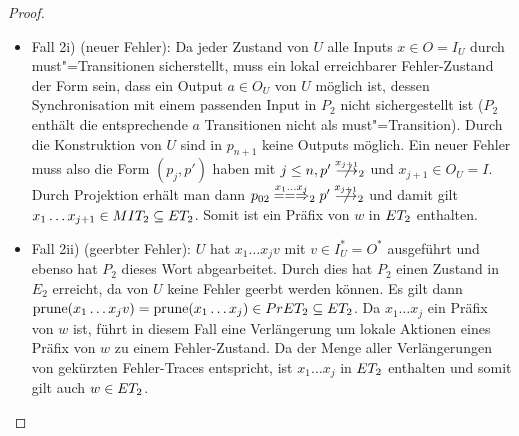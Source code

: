 \begin{proof}
\begin{itemize}
\begin{itemize}
        \item Fall 2i) (neuer Fehler): Da jeder Zustand von $U$ alle Inputs
          $x\in O=I_U$ durch must"=Transitionen sicherstellt, muss ein lokal
          erreichbarer Fehler-Zustand der Form sein, dass ein Output $a\in O_U$
          von $U$ möglich ist, dessen Synchronisation mit einem passenden Input
          in $P_2$ nicht sichergestellt ist ($P_2$ enthält die entsprechende
          $a$ Transitionen nicht als must"=Transition). Durch die Konstruktion
          von $U$ sind in $p_{n+1}$ keine Outputs möglich. Ein neuer Fehler
          muss also die Form $(p_j,p')$ haben mit $j\leq n,
          p'\nmust[x_{j+1}]_2$ und $x_{j+1}\in O_U=I$. Durch Projektion erhält
          man dann $p_{02}\lweakmay[x_1\dots x_j]_2p'\nmust[x_{j+1}]_2$ und
          damit gilt $x_1\dots x_{j+1}\in MIT _2\subseteq ET _2$. Somit ist
          ein Präfix von $w$ in $ET _2$ enthalten.
        \item Fall 2ii) (geerbter Fehler): $U$ hat $x_1\dots x_jv$ mit $v\in
          I_U^*=O^*$ ausgeführt und ebenso hat $P_2$ dieses Wort abgearbeitet.
          Durch dies hat $P_2$ einen Zustand  in $E_2$ erreicht, da von $U$
          keine Fehler geerbt werden können. Es gilt dann $\mathrm{prune} (x_1\dots
          x_j v) = \mathrm{prune} (x_1\dots x_j)\in PrET _2\subseteq ET _2$. Da
          $x_1\dots x_j$ ein Präfix von $w$ ist, führt in diesem Fall eine
          Verlängerung um lokale Aktionen eines Präfix von $w$ zu einem
          Fehler-Zustand. Da \ET{} der Menge aller Verlängerungen von gekürzten
          Fehler-Traces entspricht, ist $x_1\dots x_j$ in $ET
          _2$ enthalten und somit gilt auch $w\in ET _2$.
      \end{itemize}
  \end{itemize}


\end{proof}

